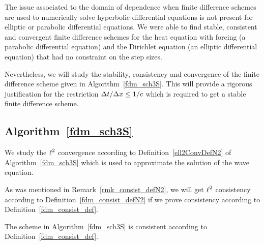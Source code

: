 The issue associated to the domain of dependence when finite
difference schemes are used to numerically solve hyperbolic 
differential equations is not present for elliptic or parabolic
differential equations.  We were able to find stable, consistent and
convergent finite difference schemes for the heat equation with
forcing (a parabolic differential equation) and the Dirichlet equation
(an elliptic differential equation) that had no constraint on
the step sizes.

Nevertheless, we will study the stability, consistency and convergence
of the finite difference scheme given in Algorithm~\ref{fdm_sch3S}.
This will provide a rigorous justification for the restriction
$\Delta{t}/\Delta{x} \leq 1/c$ which is required to get a stable finite
difference scheme.

\subsection{Algorithm~\ref{fdm_sch3S}}

We study the $\displaystyle \ell^2$ convergence according to
Definition~\ref{ell2ConvDefN2} of Algorithm~\ref{fdm_sch3S} which is
used to approximate the solution of the wave equation.

As was mentioned in Remark~\ref{rmk_consist_defN2}, we will get
$\displaystyle \ell^2$ consistency according to
Definition~\ref{fdm_consist_defN2}
if we prove consistency according to Definition~\ref{fdm_consist_def}.

\begin{prop}
The scheme in Algorithm~\ref{fdm_sch3S} is consistent according to
Definition~\ref{fdm_consist_def}.
\end{prop}

